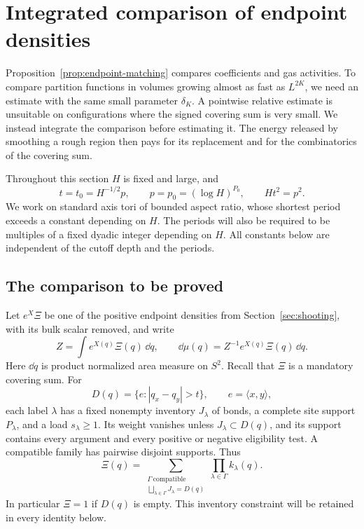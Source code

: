 \section{Integrated comparison of endpoint densities}
\label{sec:comparison}

Proposition~\ref{prop:endpoint-matching} compares coefficients and gas
activities. To compare partition functions in volumes growing almost
as fast as $L^{2K}$, we need an estimate with the same small parameter
$\delta_K$. A pointwise relative estimate is unsuitable on configurations
where the signed covering sum is very small. We instead integrate the
comparison before estimating it. The energy released by smoothing a
rough region then pays for its replacement and for the combinatorics
of the covering sum.

Throughout this section $H$ is fixed and large, and
\[
 t=t_0=H^{-1/2}p,\qquad p=p_0=(\log H)^{P_0},\qquad Ht^2=p^2.
\]
We work on standard axis tori of bounded aspect ratio, whose shortest
period exceeds a constant depending on $H$. The periods will also be
required to be multiples of a fixed dyadic integer depending on $H$.
All constants below are independent of the cutoff depth and the periods.

\subsection{The comparison to be proved}

Let $e^X\Xi$ be one of the positive endpoint densities from
Section~\ref{sec:shooting}, with its bulk scalar removed, and write
\[
 Z=\int e^{X(q)}\Xi(q)\,\dd q,
 \qquad \dd\mu(q)=Z^{-1}e^{X(q)}\Xi(q)\,\dd q.
\]
Here $\dd q$ is product normalized area measure on $S^2$. Recall that
$\Xi$ is a mandatory covering sum. For
\[
 D(q)=\{e:|q_x-q_y|>t\},\qquad e=\langle x,y\rangle,
\]
each label $\lambda$ has a fixed nonempty inventory
$J_\lambda$ of bonds, a complete site support $P_\lambda$, and a load
$s_\lambda\ge1$. Its weight vanishes unless
$J_\lambda\subset D(q)$, and its support contains every argument and
every positive or negative eligibility test. A compatible family has
pairwise disjoint supports. Thus
\begin{equation}
 \Xi(q)=\sum_{\substack{\Gamma\ \mathrm{compatible}\\
             \bigsqcup_{\lambda\in\Gamma}J_\lambda=D(q)}}
              \prod_{\lambda\in\Gamma}k_\lambda(q).
 \label{eq:comparison-mandatory-cover}
\end{equation}
In particular $\Xi=1$ if $D(q)$ is empty. This inventory constraint
will be retained in every identity below.

